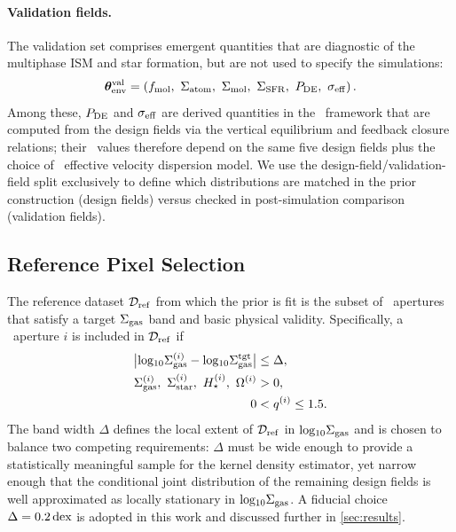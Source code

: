 \paragraph{Validation fields.}
The validation set comprises emergent quantities that are diagnostic of
the multiphase ISM and star formation, but are not used to specify the
simulations:
\begin{equation}
\boldsymbol{\theta}_{\rm env}^{\rm val} = \left({f_{\rm mol},\ \Sigma_{\rm atom},\ \Sigma_{\rm mol},\ \Sigma_{\rm SFR},\ P_{\rm DE},\ \sigma_{\rm eff}}\right).
\end{equation}
Among these, $P_{\rm DE}$ and $\sigma_{\rm eff}$ are derived quantities in the \PRFM\
framework \citep{2022ApJ...936..137O} that are computed from the design
fields via the vertical equilibrium and feedback closure relations;
their \PHANGS\ values therefore depend on the same five design fields
plus the choice of \PRFM\ effective velocity dispersion model. We use
the design-field/validation-field split exclusively to define which
distributions are matched in the prior construction (design fields)
versus checked in post-simulation comparison (validation fields).

\subsection{Reference Pixel Selection}
\label{sec:sampling:reference}

The reference dataset $\mathcal{D}_{\rm ref}$ from which the prior is fit is the subset of
\PHANGS\ apertures \citep{2022AJ....164...43S,2023ApJ...945L..19S} that
satisfy a target $\Sigma_{\rm gas}$ band and basic physical validity. Specifically,
a \PHANGS\ aperture $i$ is included in $\mathcal{D}_{\rm ref}$ if
\begin{align}
\bigl|{\rm log_{\small 10}}\Sigma_{\rm gas}^{(i)} - {\rm log_{\small 10}}\Sigma_{\rm gas}^{\rm tgt}\bigr| &\leq \Delta,
\label{eq:sgas_band}\\
\Sigma_{\rm gas}^{(i)},\ \Sigma_{\rm star}^{(i)},\ H_\star^{(i)},\ \Omega^{(i)} &> 0,
\label{eq:positivity}\\
0 &< q^{(i)} \leq 1.5.
\label{eq:q_bound}
\end{align}
The band width $\Delta$ defines the local extent of $\mathcal{D}_{\rm ref}$ in ${\rm log_{\small 10}}\Sigma_{\rm gas}$
and is chosen to balance two competing requirements: $\Delta$ must be wide
enough to provide a statistically meaningful sample for the kernel density
estimator, yet narrow enough that the conditional joint distribution of the
remaining design fields is well approximated as locally stationary in
${\rm log_{\small 10}}\Sigma_{\rm gas}$. A fiducial choice $\Delta = 0.2\,{\rm dex}$ is adopted in this work
and discussed further in \autoref{sec:results}.

